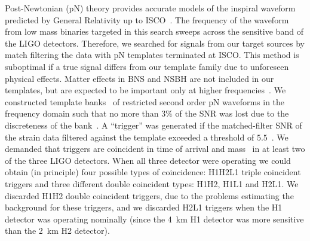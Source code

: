 Post-Newtonian (pN) theory provides accurate models of the inspiral waveform
predicted by General Relativity up to
\ac{ISCO}~\cite{Blanchet:1996pi,Droz:1999qx,Blanchet:2002av,
Buonanno:2006ui,Boyle:2007ft,Hannam:2007ik, pan:024014,Boyle:2009dg}. The
frequency of the waveform from low mass binaries targeted in this search sweeps
across the sensitive band of the LIGO detectors.  Therefore, we searched for
signals from our target sources by match filtering the data with \ac{pN}
templates terminated at \ac{ISCO}. This method is suboptimal if a true signal
differs from our template family due to unforeseen physical effects. Matter
effects in BNS and NSBH are not included in our templates, but are expected to
be important only at higher frequencies~\cite{Shibata:2009cn,Kiuchi:2009jt}. We
constructed template banks~\cite{hexabank} of restricted second order \ac{pN}
waveforms in the frequency
domain \cite{thorne.k:1987,SathyaDhurandhar:1991,Droz:1999qx} such that no more
than $3\%$ of the \ac{SNR} was lost due to the discreteness of the
bank~\cite{Owen:1998dk}. A ``trigger'' was generated if the matched-filter
\ac{SNR} of the strain data filtered against the template exceeded a threshold
of $5.5$~\cite{Allen:2005fk}.  We demanded that triggers are coincident in time
of arrival and mass~\cite{Robinson:2008} in at least two of the three \ac{LIGO}
detectors. When all three detector were operating we could obtain (in
principle) four possible types of coincidence: H1H2L1 triple coincident
triggers and three different double coincident types: H1H2, H1L1 and H2L1.  We
discarded H1H2 double coincident triggers, due to the problems estimating the
background for these triggers, and we discarded H2L1 triggers when the H1
detector was operating nominally (since the 4~km H1 detector was more sensitive
than the 2~km H2 detector).

